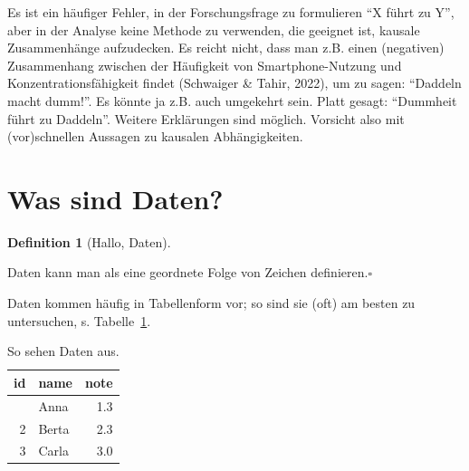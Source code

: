 \documentclass[
  a4paper,
  DIV=11]{scrreprt}
\theoremstyle{definition}
\theoremstyle{definition}
\theoremstyle{definition}
\newtheorem{definition}{Definition}[chapter]
\theoremstyle{remark}
\begin{document}
\begin{tcolorbox}[enhanced jigsaw, toptitle=1mm, rightrule=.15mm, colbacktitle=quarto-callout-caution-color!10!white, breakable, title=\textcolor{quarto-callout-caution-color}{\faFire}\hspace{0.5em}{Vorsicht}, bottomrule=.15mm, colback=white, opacitybacktitle=0.6, left=2mm, titlerule=0mm, toprule=.15mm, coltitle=black, opacityback=0, bottomtitle=1mm, arc=.35mm, leftrule=.75mm, colframe=quarto-callout-caution-color-frame]

Es ist ein häufiger Fehler, in der Forschungsfrage zu formulieren ``X
führt zu Y'', aber in der Analyse keine Methode zu verwenden, die
geeignet ist, kausale Zusammenhänge aufzudecken. Es reicht nicht, dass
man z.B. einen (negativen) Zusammenhang zwischen der Häufigkeit von
Smartphone-Nutzung und Konzentrationsfähigkeit findet (Schwaiger \&
Tahir, 2022), um zu sagen: ``Daddeln macht dumm!''. Es könnte ja z.B.
auch umgekehrt sein. Platt gesagt: ``Dummheit führt zu Daddeln''.
Weitere Erklärungen sind möglich. Vorsicht also mit (vor)schnellen
Aussagen zu kausalen Abhängigkeiten.

\end{tcolorbox}

\section{Was sind Daten?}\label{was-sind-daten}

\begin{definition}[Hallo,
Daten]\protect\hypertarget{def-daten}{}\label{def-daten}

Daten kann man als eine geordnete Folge von Zeichen
definieren.\(\square\)

\end{definition}

Daten kommen häufig in Tabellenform vor; so sind sie (oft) am besten zu
untersuchen, s. Tabelle~\ref{tbl-daten}.

\begin{longtable}{rlr}

\caption{\label{tbl-daten}So sehen Daten aus.}

\tabularnewline

\toprule
id & name & note \\ 
\midrule\addlinespace[2.5pt]
1 & Anna & 1.3 \\ 
2 & Berta & 2.3 \\ 
3 & Carla & 3.0 \\ 
\bottomrule

\end{longtable}
\end{document}
